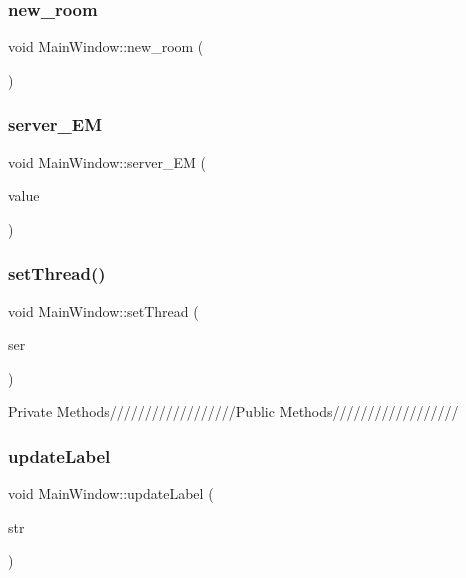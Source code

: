 \subsubsection{\texorpdfstring{new\+\_\+room}{new\_room}}
{\footnotesize\ttfamily void Main\+Window\+::new\+\_\+room (\begin{DoxyParamCaption}{ }\end{DoxyParamCaption})\hspace{0.3cm}{\ttfamily [slot]}}

\mbox{\label{class_main_window_a49925c6b00f15c1d53039324c5527430}} 
\subsubsection{\texorpdfstring{server\+\_\+\+EM}{server\_EM}}
{\footnotesize\ttfamily void Main\+Window\+::server\+\_\+\+EM (\begin{DoxyParamCaption}\item[{Q\+String}]{value }\end{DoxyParamCaption})\hspace{0.3cm}{\ttfamily [slot]}}

\mbox{\label{class_main_window_a251886b877d475b08cf0291c5529767e}} 
\subsubsection{\texorpdfstring{set\+Thread()}{setThread()}}
{\footnotesize\ttfamily void Main\+Window\+::set\+Thread (\begin{DoxyParamCaption}\item[{\mbox{\hyperlink{class_thread}{Thread}} $\ast$}]{ser }\end{DoxyParamCaption})}

Private Methods//////////////////\+Public Methods////////////////// \mbox{\label{class_main_window_ae0210b36ab2d1cce80443e36942e4ac7}} 
\subsubsection{\texorpdfstring{update\+Label}{updateLabel}}
{\footnotesize\ttfamily void Main\+Window\+::update\+Label (\begin{DoxyParamCaption}\item[{Q\+String}]{str }\end{DoxyParamCaption})\hspace{0.3cm}{\ttfamily [slot]}}

